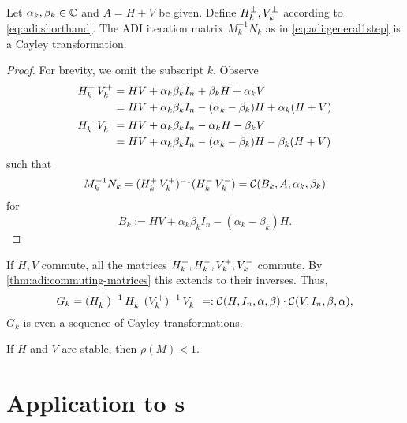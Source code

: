 \begin{lemma}
  Let $\alpha_k,\beta_k\in\mathbb{C}$ and $A=H+V$ be given.
  Define $\mathop{H_k^\pm}, \mathop{V_k^\pm}$ according to \eqref{eq:adi:shorthand}.
  The \ac{ADI} iteration matrix $M_k^{-1}N_k$ as in \eqref{eq:adi:general1step} is a Cayley transformation.
\end{lemma}
\begin{proof}
  For brevity, we omit the subscript $k$.
  Observe
  \begin{align*}
    \mathop{H_k^+}\mathop{V_k^+}
    &= HV + \alpha_k\beta_k I_n + \beta_k H + \alpha_k V \\
    &= HV + \alpha_k\beta_k I_n - (\alpha_k-\beta_k)H + \alpha_k(H+V) \\
    \mathop{H_k^-}\mathop{V_k^-}
    &= HV + \alpha_k\beta_k I_n - \alpha_k H - \beta_k V \\
    &= HV + \alpha_k\beta_k I_n - (\alpha_k-\beta_k)H - \beta_k(H+V)
  \end{align*}
  such that
  \begin{equation*}
    M_k^{-1} N_k
    = (\mathop{H_k^+}\mathop{V_k^+})^{-1}(\mathop{H_k^-}\mathop{V_k^-})
    = \mathcal{C}(B_k, A, \alpha_k, \beta_k)
  \end{equation*}
  for
  \begin{equation*}
    B_k := HV + \alpha_k\beta_k I_n - (\alpha_k-\beta_k)H
    .
  \end{equation*}
\end{proof}

If $H,V$ commute,
all the matrices $\mathop{H_k^+},\mathop{H_k^-},\mathop{V_k^+},\mathop{V_k^-}$ commute.
By \autoref{thm:adi:commuting-matrices} this extends to their inverses.
Thus,
\begin{equation*}
  G_k =
  \mathop{(\mathop{H_k^+})^{-1}}\mathop{H_k^-}
  \mathop{(\mathop{V_k^+})^{-1}}\mathop{V_k^-}
  =:
  \mathcal{C}(H, I_n, \alpha, \beta)
  \cdot
  \mathcal{C}(V, I_n, \beta, \alpha)
  ,
\end{equation*}
\ie $G_k$ is even a sequence of Cayley transformations.

\begin{hypothesis}
\label{thm:adi:convergence}
  If $H$ and $V$ are stable, then $\rho(M) < 1$.
\end{hypothesis}

\section{Application to s}
\label{sec:adi:ale}

